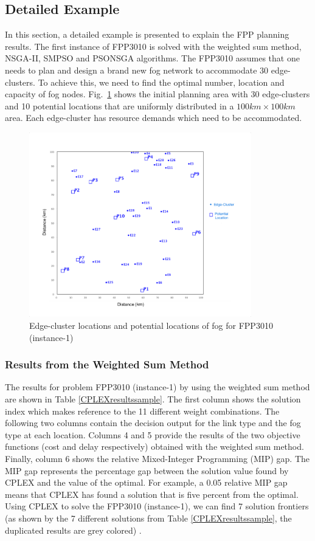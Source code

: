 \documentclass[10pt,journal,compsoc]{IEEEtran}
\newcommand{\Fig}[1]{Fig.~\ref{#1}}
\begin{document}
\subsection{Detailed Example}
In this section, a detailed example is presented to explain the FPP planning results. The first instance of FPP3010 is solved with the weighted sum method, NSGA-II, SMPSO and PSONSGA algorithms. The FPP3010 assumes that one needs to plan and design a brand new fog network to accommodate 30 edge-clusters. To achieve this, we need to find the optimal number, location and capacity of fog nodes. \Fig{nettopology} shows the initial planning area with 30 edge-clusters and 10 potential locations that are uniformly distributed in a $100km \times 100km$ area. 
Each edge-cluster has resource demands which need to be accommodated. 

\begin{figure}[ht]
\centerline{\includegraphics[trim=0 50 0 50,clip,width=3.8in]{100x100problem.png}}
\caption{Edge-cluster locations and potential locations of fog for FPP3010 (instance-1)} 
\label{nettopology}
\end{figure}

\subsubsection{Results from the Weighted Sum Method}
The results for problem FPP3010 (instance-1) by using the weighted sum method are shown in Table \ref{CPLEXresultssample}. The first column shows the solution index which makes reference to the 11 different weight combinations. The following two columns contain the decision output for the link type and the fog type at each location. Columns 4 and 5 provide the results of the two objective functions (cost and delay respectively) obtained with the weighted sum method. Finally, column 6 shows the relative Mixed-Integer Programming (MIP) gap. The MIP gap represents the percentage gap between the solution value found by CPLEX and the value of the optimal. For example, a 0.05 relative MIP gap means that CPLEX has found a solution that is five percent from the optimal. Using CPLEX to solve the FPP3010 (instance-1), we can find 7 solution frontiers (as shown by the 7 different solutions from Table \ref{CPLEXresultssample}, the duplicated results are grey colored) . 
\end{document}
